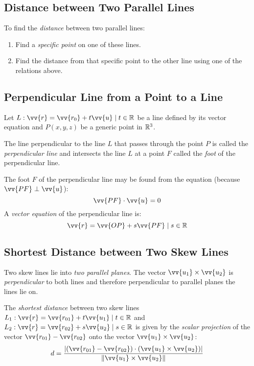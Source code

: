 \subsection{Distance between Two Parallel Lines}
	To find the \emph{distance} between two parallel lines:
	\begin{enumerate}
		\item Find a \emph{specific point} on one of these lines.
		\item Find the distance from that specific point to the other line using one of the relations above.
	\end{enumerate}
\subsection{Perpendicular Line from a Point to a Line}
	Let $L: \vv{r} = \vv{r_0} + t\vv{u} \such t \in \real$ be a line defined by its vector equation and $P(x,y,z)$ be a generic point in $\mathbb{R}^3$.

	The line perpendicular to the line $L$ that passes through the point $P$ is called the \emph{perpendicular line} and intersects the line $L$ at a point $F$ called the \emph{foot} of the perpendicular line.

	The foot $F$ of the perpendicular line may be found from the equation (because $\vv{PF} \perp \vv{u}$):
	\[\vv{PF} \cdot \vv{u} = 0\]
	A \emph{vector equation} of the perpendicular line is:
	\[\vv{r} = \vv{OP} + s\vv{PF} \such s \in \real\]
\subsection{Shortest Distance between Two Skew Lines}
	Two skew lines lie into \emph{two parallel planes}.
	The vector $\vv{u_1} \times \vv{u_2}$ is \emph{perpendicular} to both lines and therefore perpendicular to parallel planes the lines lie on.

	The \emph{shortest distance} between two skew lines $L_1: \vv{r} = \vv{r_{01}} + t\vv{u_1} \such t \in \real$ and $L_2: \vv{r} = \vv{r_{02}} + s\vv{u_2} \such s \in \real$ is given by the \emph{scalar projection} of the vector $\vv{r_{01}} - \vv{r_{02}}$ onto the vector $\vv{u_1} \times \vv{u_2}$:
	\begin{equation}\label{eq:9.5:shortestSkewDist}
		d = \frac{\abs{ ( \vv{r_{01}} - \vv{r_{02}}) \cdot (\vv{u_1} \times \vv{u_2})}}{\norm{\vv{u_1} \times \vv{u_2}}}
	\end{equation}
